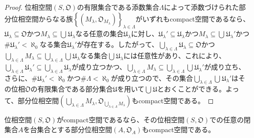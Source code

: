 \documentclass[dvipdfmx]{jsarticle}
\begin{document}
\begin{proof}
位相空間$\left( S,\mathfrak{O} \right)$の有限集合である添数集合$\varLambda$によって添数づけられた部分位相空間からなる族$\left\{ \left( M_{\lambda},\mathfrak{O}_{M_{\lambda}} \right) \right\}_{\lambda \in \varLambda }$がいずれもcompact空間であるなら、$\mathfrak{U}_{\lambda}\subseteq \mathfrak{O}$かつ$M_{\lambda} \subseteq \bigcup_{} \mathfrak{U}_{\lambda}$なる任意の集合$\mathfrak{U}_{\lambda}$に対し、$\mathfrak{U}_{\lambda}' \subseteq \mathfrak{U}_{\lambda}$かつ$M_{\lambda} \subseteq \bigcup_{} \mathfrak{U}_{\lambda}'$かつ${\#}\mathfrak{U}_{\lambda}' < \aleph_{0}$なる集合$\mathfrak{U}_{\lambda}'$が存在する。したがって、$\bigcup_{\lambda \in \varLambda } \mathfrak{U}_{\lambda}\subseteq \mathfrak{O}$かつ$\bigcup_{\lambda \in \varLambda } M_{\lambda} \subseteq \bigcup_{\lambda \in \varLambda } {\bigcup_{} \mathfrak{U}_{\lambda}}$なる集合$\bigcup_{} \mathfrak{U}_{\lambda}$には任意性があり、これにより、$\bigcup_{\lambda \in \varLambda } \mathfrak{U}_{\lambda}' \subseteq \bigcup_{\lambda \in \varLambda } \mathfrak{U}_{\lambda}$が成り立つかつ、$\bigcup_{\lambda \in \varLambda} M_{\lambda} \subseteq \bigcup_{\lambda \in \varLambda } {\bigcup_{} \mathfrak{U}_{\lambda}'}$が成り立ち、さらに、${\#}\mathfrak{U}_{\lambda}' < \aleph_{0}$かつ${\#}\varLambda < \aleph_{0}$が成り立つので、その集合$\bigcup_{\lambda \in \varLambda } {\bigcup_{} \mathfrak{U}_{\lambda}'}$はその位相$\mathfrak{O}$の有限集合である部分集合$\mathfrak{U}$を用いて$\bigcup_{} \mathfrak{U}$とおくことができる。よって、部分位相空間$\left( \bigcup_{\lambda \in \varLambda } M_{\lambda},\mathfrak{O}_{\bigcup_{\lambda \in \varLambda } M_{\lambda}} \right)$もcompact空間である。
\end{proof}
\begin{thm}\label{8.1.6.4}
位相空間$\left( S,\mathfrak{O} \right)$がcompact空間であるなら、その位相空間$\left( S,\mathfrak{O} \right)$での任意の閉集合$A$を台集合とする部分位相空間$\left( A,\mathfrak{O}_{A} \right)$もcompact空間である。
\end{thm}
\end{document}
